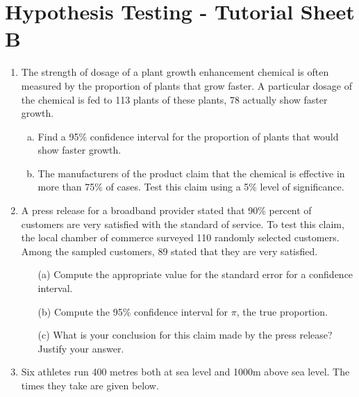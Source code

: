 \documentclass[]{article}
\begin{document}
\section*{Hypothesis Testing - Tutorial Sheet B  }
\begin{enumerate}


\item The strength of dosage of a plant growth enhancement chemical is often measured by the proportion of plants that grow faster. A particular dosage of the chemical is fed to 113 plants of these plants, 78 actually show faster growth.

\begin{enumerate}[(a)]

\item Find a 95\% confidence interval for the proportion of plants that would show faster growth.
\item The manufacturers of the product claim that the chemical is effective in more than 75\% of cases. Test this claim using a 5\% level of significance.

\end{enumerate}


\item
A press release for a broadband provider stated that 90\% percent of customers
are very satisfied with the standard of service. To test this claim,
the local chamber of commerce surveyed 110 randomly selected customers.
Among the sampled customers, 89 stated that they are very satisfied.
\begin{itemize}
    \item[(a)] Compute the appropriate value for the standard error for
a confidence interval.
   \item[(b)] Compute the 95\% confidence interval for $\pi$, the true proportion.
   \item[(c)] What is your conclusion for this claim made by the press
release? Justify your answer.
\end{itemize}

\item 


Six athletes run 400 metres both at sea level and 1000m above sea level. The times they take are given below. 


\end{enumerate}
\end{document}
